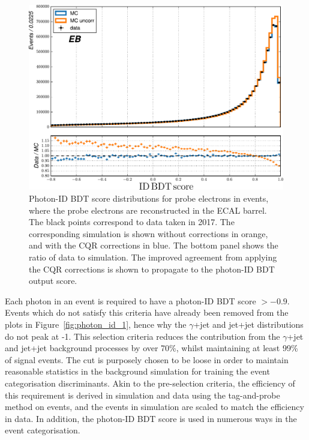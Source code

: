 \begin{figure}
  \centering
  \includegraphics[width=.5\textwidth]{Figures/hgg_overview/dataMC_probePhoIdMVA_0_corr.pdf}
  \caption[Corrections from the chained quantile regression method in the ID BDT output score]
  {
    Photon-ID BDT score distributions for probe electrons in \Zee events, where the probe electrons are reconstructed in the ECAL barrel. The black points correspond to data taken in 2017. The corresponding simulation is shown without corrections in orange, and with the CQR corrections in blue. The bottom panel shows the ratio of data to simulation. The improved agreement from applying the CQR corrections is shown to propagate to the photon-ID BDT output score.
  }
  \label{fig:photon_id_2}
\end{figure}

Each photon in an event is required to have a photon-ID BDT score $>-0.9$. Events which do not satisfy this criteria have already been removed from the plots in Figure~\ref{fig:photon_id_1}, hence why the $\gamma$+jet and jet+jet distributions do not peak at -1. This selection criteria reduces the contribution from the $\gamma$+jet and jet+jet background processes by over 70\%, whilst maintaining at least 99\% of signal events. The cut is purposely chosen to be loose in order to maintain reasonable statistics in the background simulation for training the event categorisation discriminants. Akin to the pre-selection criteria, the efficiency of this requirement is derived in simulation and data using the tag-and-probe method on \Zee events, and the events in simulation are scaled to match the efficiency in data. In addition, the photon-ID BDT score is used in numerous ways in the event categorisation.

